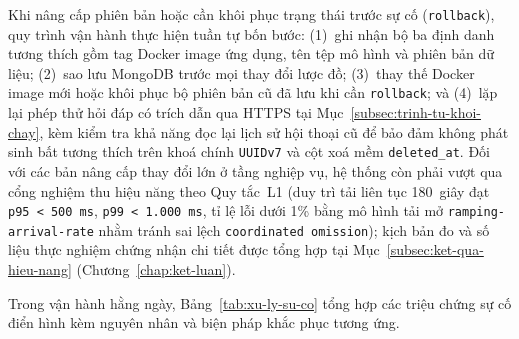 Khi nâng cấp phiên bản hoặc cần khôi phục trạng thái trước sự cố (\texttt{rollback}), quy trình vận hành thực hiện tuần tự bốn bước: (1)~ghi nhận bộ ba định danh tương thích gồm tag Docker image ứng dụng, tên tệp mô hình và phiên bản dữ liệu; (2)~sao lưu MongoDB trước mọi thay đổi lược đồ; (3)~thay thế Docker image mới hoặc khôi phục bộ phiên bản cũ đã lưu khi cần \texttt{rollback}; và (4)~lặp lại phép thử hỏi đáp có trích dẫn qua HTTPS tại Mục~\ref{subsec:trinh-tu-khoi-chay}, kèm kiểm tra khả năng đọc lại lịch sử hội thoại cũ để bảo đảm không phát sinh bất tương thích trên khoá chính \texttt{UUIDv7} và cột xoá mềm \texttt{deleted\_\allowbreak{}at}. Đối với các bản nâng cấp thay đổi lớn ở tầng nghiệp vụ, hệ thống còn phải vượt qua cổng nghiệm thu hiệu năng theo Quy tắc~L1 (duy trì tải liên tục 180~giây đạt \texttt{p95 < 500 ms}, \texttt{p99 < 1.000 ms}, tỉ lệ lỗi dưới 1\% bằng mô hình tải mở \texttt{ramping-\allowbreak{}arrival-\allowbreak{}rate} nhằm tránh sai lệch \texttt{coordinated omission}); kịch bản đo và số liệu thực nghiệm chứng nhận chi tiết được tổng hợp tại Mục~\ref{subsec:ket-qua-hieu-nang} (Chương~\ref{chap:ket-luan}).

Trong vận hành hằng ngày, Bảng~\ref{tab:xu-ly-su-co} tổng hợp các triệu chứng sự cố điển hình kèm nguyên nhân và biện pháp khắc phục tương ứng.

